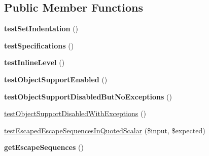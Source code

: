 \subsection*{Public Member Functions}
\begin{DoxyCompactItemize}
\item 
{\bfseries test\+Set\+Indentation} ()\hypertarget{classSymfony_1_1Component_1_1Yaml_1_1Tests_1_1DumperTest_aabac83c9fa10410f1a688d854931e991}{}\label{classSymfony_1_1Component_1_1Yaml_1_1Tests_1_1DumperTest_aabac83c9fa10410f1a688d854931e991}

\item 
{\bfseries test\+Specifications} ()\hypertarget{classSymfony_1_1Component_1_1Yaml_1_1Tests_1_1DumperTest_a6e70b7389c862c970277c0b9d828f55d}{}\label{classSymfony_1_1Component_1_1Yaml_1_1Tests_1_1DumperTest_a6e70b7389c862c970277c0b9d828f55d}

\item 
{\bfseries test\+Inline\+Level} ()\hypertarget{classSymfony_1_1Component_1_1Yaml_1_1Tests_1_1DumperTest_ae33e730f5f136099dec481a4e6ef5d2c}{}\label{classSymfony_1_1Component_1_1Yaml_1_1Tests_1_1DumperTest_ae33e730f5f136099dec481a4e6ef5d2c}

\item 
{\bfseries test\+Object\+Support\+Enabled} ()\hypertarget{classSymfony_1_1Component_1_1Yaml_1_1Tests_1_1DumperTest_a0528ef827fd155fc6c23e56742ee67a1}{}\label{classSymfony_1_1Component_1_1Yaml_1_1Tests_1_1DumperTest_a0528ef827fd155fc6c23e56742ee67a1}

\item 
{\bfseries test\+Object\+Support\+Disabled\+But\+No\+Exceptions} ()\hypertarget{classSymfony_1_1Component_1_1Yaml_1_1Tests_1_1DumperTest_a79c98a3b3f36bca1235e40b28e544488}{}\label{classSymfony_1_1Component_1_1Yaml_1_1Tests_1_1DumperTest_a79c98a3b3f36bca1235e40b28e544488}

\item 
\hyperlink{classSymfony_1_1Component_1_1Yaml_1_1Tests_1_1DumperTest_aa414cb5288d218b92a75d01bc0a38cf3}{test\+Object\+Support\+Disabled\+With\+Exceptions} ()
\item 
\hyperlink{classSymfony_1_1Component_1_1Yaml_1_1Tests_1_1DumperTest_adabc2303154aa1aa9ac4271064ee1e70}{test\+Escaped\+Escape\+Sequences\+In\+Quoted\+Scalar} (\$input, \$expected)
\item 
{\bfseries get\+Escape\+Sequences} ()\hypertarget{classSymfony_1_1Component_1_1Yaml_1_1Tests_1_1DumperTest_abbea4cecd175e4c016b120180c0cf030}{}\label{classSymfony_1_1Component_1_1Yaml_1_1Tests_1_1DumperTest_abbea4cecd175e4c016b120180c0cf030}

\end{DoxyCompactItemize}
